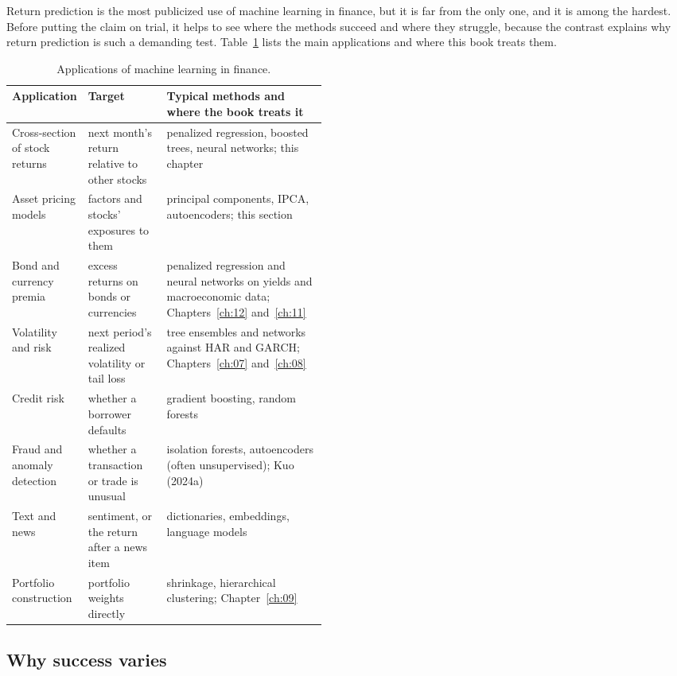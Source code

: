 Return prediction is the most publicized use of machine learning in finance, but it is far from the only one, and it is among the hardest. Before putting the claim on trial, it helps to see where the methods succeed and where they struggle, because the contrast explains why return prediction is such a demanding test. Table~\ref{tab:20-applications} lists the main applications and where this book treats them.

\begin{table}[htbp]
\centering
\small
\caption{Applications of machine learning in finance.}
\label{tab:20-applications}
\begin{tabularx}{0.95\linewidth}{@{}>{\raggedright\arraybackslash}p{0.21\linewidth}>{\raggedright\arraybackslash}p{0.25\linewidth}>{\raggedright\arraybackslash}X@{}}
\toprule
Application & Target & Typical methods and where the book treats it \\
\midrule
Cross-section of stock returns & next month's return relative to other stocks & penalized regression, boosted trees, neural networks; this chapter \\
Asset pricing models & factors and stocks' exposures to them & principal components, IPCA, autoencoders; this section \\
Bond and currency premia & excess returns on bonds or currencies & penalized regression and neural networks on yields and macroeconomic data; Chapters~\ref{ch:12} and~\ref{ch:11} \\
Volatility and risk & next period's realized volatility or tail loss & tree ensembles and networks against HAR and GARCH; Chapters~\ref{ch:07} and~\ref{ch:08} \\
Credit risk & whether a borrower defaults & gradient boosting, random forests \\
Fraud and anomaly detection & whether a transaction or trade is unusual & isolation forests, autoencoders (often unsupervised); Kuo (2024a) \\
Text and news & sentiment, or the return after a news item & dictionaries, embeddings, language models \\
Portfolio construction & portfolio weights directly & shrinkage, hierarchical clustering; Chapter~\ref{ch:09} \\
\bottomrule
\end{tabularx}
\end{table}

\subsection{Why success varies}

